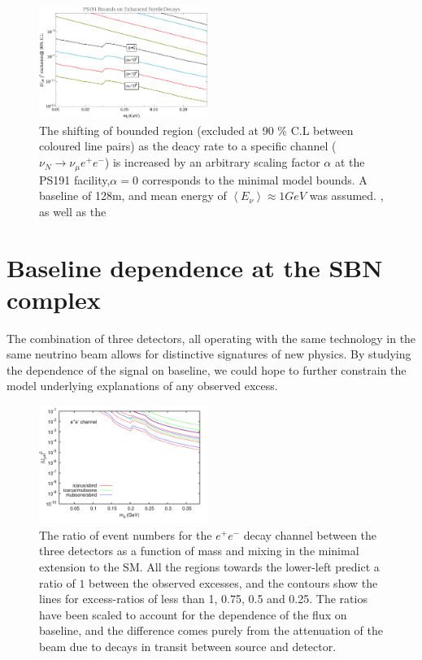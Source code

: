 \documentclass[11pt, a4paper]{article}
\begin{document}
 
\begin{figure}[t]
%
\centering
%
\includegraphics[width=0.49\textwidth]{figures/ps191_enhanced.pdf} 
%
\caption{\label{fig:ps191_enhance}The shifting of bounded region (excluded at
90 \% C.L  between coloured line pairs) as the deacy rate to a specific channel
($\nu_N \rightarrow \nu_\mu e^+e^-$) is increased by an arbitrary scaling
factor $\alpha$ at the PS191 facility,$\alpha = 0$ corresponds to the minimal
model bounds. A baseline of 128m, and mean energy of $\left< E_\nu \right>
\approx 1 GeV$ was assumed.  , as well as the }
%
\end{figure}

\section{Baseline dependence at the SBN complex}

The combination of three detectors, all operating with the same technology in
the same neutrino beam allows for distinctive signatures of new physics. By
studying the dependence of the signal on baseline, we could hope to further
constrain the model underlying explanations of any observed excess. 

\begin{figure}[t]
%
\centering
%
\includegraphics[width=0.49\textwidth,clip,trim=0 20 35 10]{figures/baselineratios_ee_um4.pdf} 
%
\caption{\label{fig:baselineratios} The ratio of event numbers for the $e^+e^-$
decay channel between the three detectors as a function of mass and mixing in
the minimal extension to the SM.  All the regions towards the lower-left
predict a ratio of $1$ between the observed excesses, and the contours show the
lines for excess-ratios of less than 1, 0.75, 0.5 and 0.25. The ratios have been scaled
to account for the dependence of the flux on baseline, and the difference comes
purely from the attenuation of the beam due to decays in transit between source
and detector. }
%
\end{figure}
\end{document}
